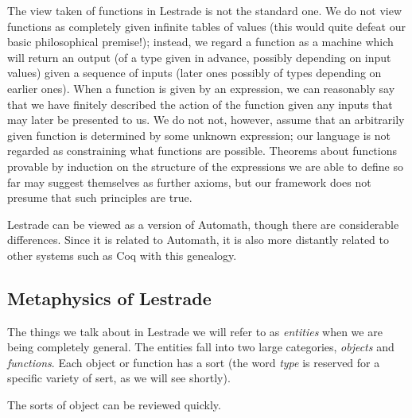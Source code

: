 \documentclass[12pt]{article}
\begin{document}
The view taken of functions in Lestrade is not the standard one.  We do not view functions as completely given infinite tables of values (this would quite defeat our basic philosophical premise!); instead, we regard a function as a machine which will return an output (of a type given in advance, possibly depending on input values) given a sequence of inputs (later ones possibly of types depending on earlier ones).  When a function is given by an expression, we can reasonably say that we have finitely described the action of the function given any inputs that may later be presented to us.  We do not not, however, assume that an arbitrarily given function is determined by some unknown expression;  our language is not regarded as constraining what functions are possible.  Theorems about functions provable by induction on the structure of the expressions we are able to define so far may suggest themselves as further axioms, but our framework does not presume that such principles are true.

Lestrade can be viewed as a version of Automath, though there are considerable differences.  Since it is related to Automath, it is also more distantly related to other systems such as Coq with this genealogy.

\subsection{Metaphysics of Lestrade}

The things we talk about in Lestrade we will refer to as {\em entities} when we are being completely general.  The entities fall into two large categories, 
{\em objects\/} and {\em functions\/}.  Each object or function has a sort (the word {\em type\/} is reserved for a specific variety of sert, as we will see shortly).

The sorts of object can be reviewed quickly.
\end{document}
